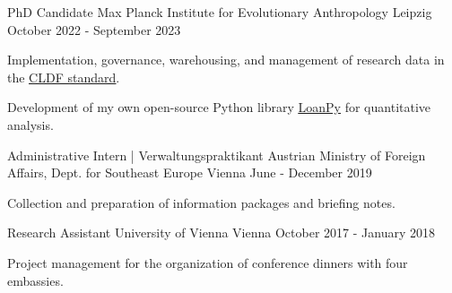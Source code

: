 \begin{cventries}

  \cventry
    {PhD Candidate} %
    {Max Planck Institute for Evolutionary Anthropology} %
    {Leipzig} %
    {October 2022 - September 2023} %
    {
      \begin{cvitems} %
      \item{Implementation, governance, warehousing, and management of research data in the \underline{\href{https://cldf.clld.org/}{CLDF standard}}.}
      \item{Development of my own open-source Python library \underline{\href{https://pypi.org/project/loanpy/}{LoanPy}} for quantitative analysis.}
      \end{cvitems}
    }
    
  \cventry
    {Administrative Intern | Verwaltungspraktikant} %
    {Austrian Ministry of Foreign Affairs, Dept. for Southeast Europe} %
    {Vienna} %
    {June - December 2019} %
    {
      \begin{cvitems} %
        \item{Collection and preparation of information packages and briefing notes.}
      \end{cvitems}
    }

  \cventry
    {Research Assistant} %
    {University of Vienna} %
    {Vienna} %
    {October 2017 - January 2018} %
    {
    \begin{cvitems}
    \item{Project management for the organization of conference dinners with four embassies.}
    \end{cvitems}
    }
    

        
\end{cventries}
